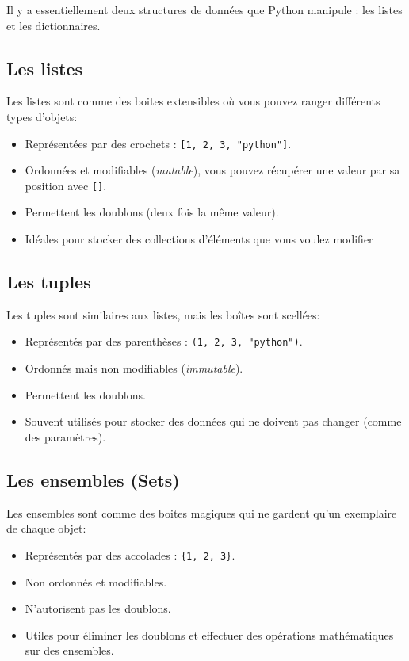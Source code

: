 \documentclass[
  11pt,
  letterpaper,
  open=any,
  twoside=false,
  french]{scrbook}
\begin{document}
Il y a essentiellement deux structures de données que Python manipule :
les listes et les dictionnaires.

\subsection{Les listes}\label{les-listes}

Les listes sont comme des boites extensibles où vous pouvez ranger
différents types d'objets:

\begin{itemize}
\item
  Représentées par des crochets : \texttt{{[}1,\ 2,\ 3,\ "python"{]}}.
\item
  Ordonnées et modifiables (\emph{mutable}), vous pouvez récupérer une
  valeur par sa position avec \texttt{{[}{]}}.
\item
  Permettent les doublons (deux fois la même valeur).
\item
  Idéales pour stocker des collections d'éléments que vous voulez
  modifier
\end{itemize}

\subsection{Les tuples}\label{les-tuples}

Les tuples sont similaires aux listes, mais les boîtes sont scellées:

\begin{itemize}
\item
  Représentés par des parenthèses : \texttt{(1,\ 2,\ 3,\ "python")}.
\item
  Ordonnés mais non modifiables (\emph{immutable}).
\item
  Permettent les doublons.
\item
  Souvent utilisés pour stocker des données qui ne doivent pas changer
  (comme des paramètres).
\end{itemize}

\subsection{Les ensembles (Sets)}\label{les-ensembles-sets}

Les ensembles sont comme des boites magiques qui ne gardent qu'un
exemplaire de chaque objet:

\begin{itemize}
\item
  Représentés par des accolades : \texttt{\{1,\ 2,\ 3\}}.
\item
  Non ordonnés et modifiables.
\item
  N'autorisent pas les doublons.
\item
  Utiles pour éliminer les doublons et effectuer des opérations
  mathématiques sur des ensembles.
\end{itemize}
\end{document}
